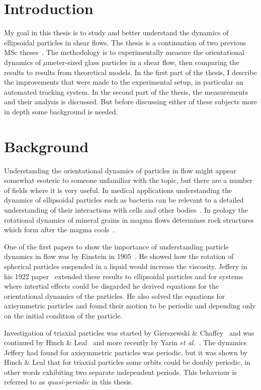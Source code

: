 \section{Introduction}
My goal in this thesis is to study and better understand the dynamics of ellipsoidal particles in shear flows. The thesis is a continuation of two previous MSc theses~\cite{AntonThesis, JonasThesis}. The methodology is to experimentally measure the orientational dynamics of $\mu$meter-sized glass particles in a shear flow, then comparing the results to results from theoretical models. In the first part of the thesis, I describe the improvements that were made to the experimental setup, in particular an automated tracking system. In the second part of the thesis, the measurements and their analysis is discussed. But before discussing either of these subjects more in depth some background is needed.

\section{Background}
Understanding the orientational dynamics of particles in flow might appear somewhat esoteric to someone unfamiliar with the topic, but there are a number of fields where it is very useful. In medical applications understanding the dynamics of ellipsoidal particles such as bacteria can be relevant to a detailed understanding of their interactions with cells and other bodies~\cite{Tolga}. In geology the rotational dynamics of mineral grains in magma flows determines rock structures which form after the magma cools~\cite{geology}.

One of the first papers to show the importance of understanding particle dynamics in flow was by Einstein in 1905~\cite{Einstein}. He showed how the rotation of spherical particles suspended in a liquid would increase the viscosity. Jeffery in his 1922 paper~\cite{Jeffery} extended these results to ellipsoidal  particles and for systems where intertial effects could be disgarded he derived equations for the orientational dynamics of the particles. He also solved the equations for axisymmetric particles and found their motion to be periodic and depending only on the initial condition of the particle. 

Investigation of triaxial particles was started by Gierszewski \& Chaffey~\cite{Chaffey} and was continued by Hinch \& Leal~\cite{Leal} and more recently by Yarin \emph{et al.}~\cite{Yarin}. 
The dynamics Jeffery had found for axisymmetric particles was periodic, but it was shown by Hinch \& Leal that for triaxial particles some orbits could be doubly periodic, in other words exhibiting two separate independent periods. This behaviour is referred to as \emph{quasi-periodic} in this thesis.


